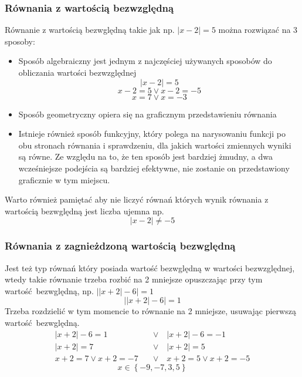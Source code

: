 \documentclass[12pt, a4paper]{article}
\begin{document}
\subsubsection{Równania z wartością bezwzględną}
Równanie z wartością bezwględną takie jak np. $\left|x-2\right|=5$ można rozwiązać na 3 sposoby:
\begin{itemize}
  \item Sposób algebraiczny jest jednym z najczęściej używanych sposobów do obliczania wartości bezwzględnej
      $$\left|x-2\right|=5$$
      $$x-2=5 \vee x-2=-5$$
      $$x=7\vee x=-3$$
  \item Sposób geometryczny opiera się na graficznym przedstawieniu równania
    \begin{center}
    \end{center}
  \item Istnieje również sposób funkcyjny, który polega na narysowaniu funkcji po
        obu stronach równania i sprawdzeniu, dla jakich wartości zmiennych wyniki są
        równe. Ze względu na to, że ten sposób jest bardziej żmudny, a dwa wcześniejsze
        podejścia są bardziej efektywne, nie zostanie on przedstawiony graficznie w tym miejscu.
\end{itemize}
Warto również pamiętać aby nie liczyć równań których wynik równania z wartością bezwględną jest liczba ujemna np.
$$\left|x-2\right|\neq-5$$


\subsubsection{Równania z zagnieżdzoną wartością bezwględną}
Jest też typ równań który posiada wartość bezwględną w wartości bezwzględnej,
wtedy takie równanie trzeba rozbić na 2 mniejsze opuszczając przy tym
wartość bezwględną, np. $\left|\left|x+2\right|-6\right| = 1$
$$\left|\left|x+2\right|-6\right|=1$$
Trzeba rozdzielić w tym momencie to równanie na 2 mniejsze, usuwając pierwszą wartość bezwględną.
\begin{align*}
\left|x+2\right|-6=1 \quad & \vee \quad \left|x+2\right|-6=-1 \\
\left|x+2\right|=7 \quad & \vee \quad \left|x+2\right|=5 \\
x+2=7 \vee x+2=-7 \hspace{1em} & \vee \hspace{1em} x+2=5 \vee x+2=-5
\end{align*}
$$x \in \left\{ -9, -7, 3, 5\right\}$$
\end{document}
